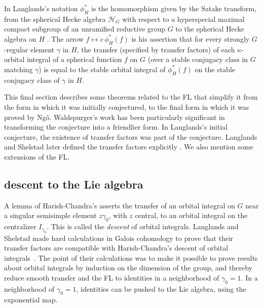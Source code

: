 \documentclass[brochure,english,12pt]{bourbaki}
\theoremstyle{plain}
\begin{document}
 In Langlands's notation $\phi_H^*$ is the homomorphism given by the
 Satake transform, from the spherical Hecke algebra ${\mathcal H}_G$
  with respect to a hyperspecial maximal compact subgroup
of an unramified reductive group $G$ to the spherical Hecke algebra
 on $H$ .  The
 arrow $f\mapsto c\,\phi_H^*(f)$ is his assertion that for every
 strongly $G$-regular element $\gamma$ in $H$, the transfer (specified by
 transfer factors) of each $\kappa$-orbital integral of a spherical
 function $f$ on $G$ (over a stable conjugacy class in $G$ matching
 $\gamma$) is equal to the stable orbital integral of $\phi_H^*(f)$ on
 the stable conjugacy class of $\gamma$ in $H$.

 This final section describes some theorems related to the FL that
 simplify it from the form in which it was initially conjectured, to
 the final form in which it was proved by Ng\^o.  Waldspurger's work
 has been particularly significant in transforming the conjecture into
 a friendlier form.  In Langlands's initial conjecture, the existence
 of transfer factors was part of the conjecture.  Langlands and
 Shelstad later defined the transfer factors explicitly
 \cite{LS:1987}.  We also mention some extensions of the FL.

\subsection{descent to the Lie algebra}\label{sec:descent}

A lemma of Harish-Chandra's asserts the transfer of an orbital
integral on $G$ near a singular semisimple element $z\gamma_0$, with
$z$ central, to an orbital integral on the centralizer $I_{\gamma_0}$.
This is called the {\it descent} of orbital integrals.  Langlands and
Shelstad made hard calculations in Galois cohomology to prove that their
transfer factors are compatible with Harish-Chandra's descent of
orbital integrals~\cite{LS:1990}.  The point of their calculations was
to make it possible to prove results about orbital integrals by
induction on the dimension of the group, and thereby reduce smooth
transfer and the FL to identities in a neighborhood of $\gamma_0=1$.
In a neighborhood of $\gamma_0=1$, identities can be pushed to the Lie
algebra, using the exponential map.
\end{document}
